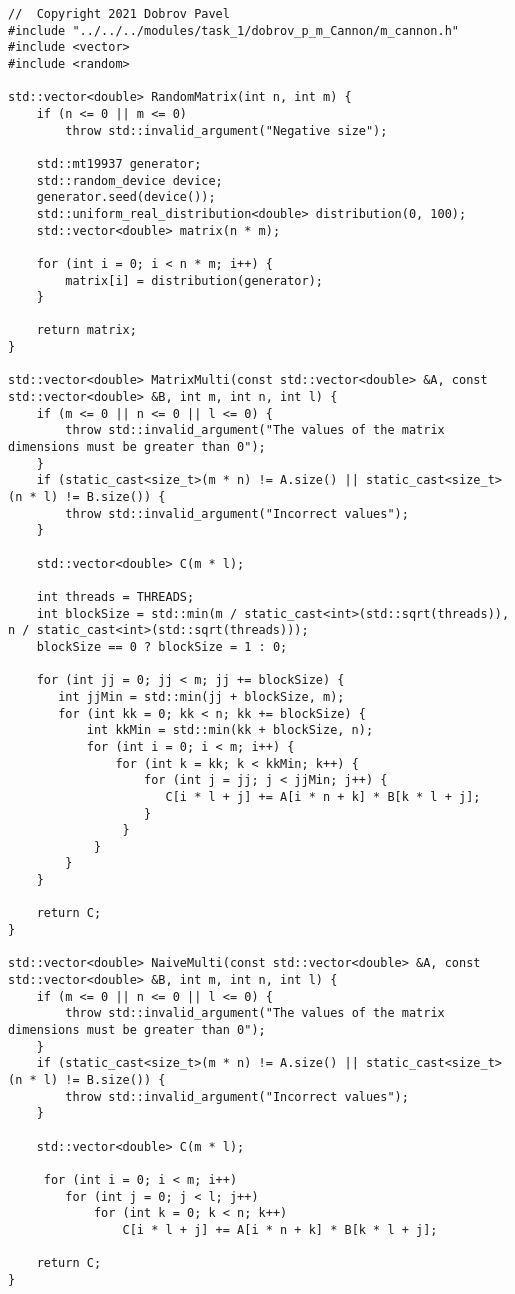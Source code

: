 \documentclass{report}
\begin{document}
\begin{lstlisting}
//  Copyright 2021 Dobrov Pavel
#include "../../../modules/task_1/dobrov_p_m_Cannon/m_cannon.h"
#include <vector>
#include <random>

std::vector<double> RandomMatrix(int n, int m) {
    if (n <= 0 || m <= 0)
        throw std::invalid_argument("Negative size");

    std::mt19937 generator;
    std::random_device device;
    generator.seed(device());
    std::uniform_real_distribution<double> distribution(0, 100);
    std::vector<double> matrix(n * m);

    for (int i = 0; i < n * m; i++) {
        matrix[i] = distribution(generator);
    }

    return matrix;
}

std::vector<double> MatrixMulti(const std::vector<double> &A, const std::vector<double> &B, int m, int n, int l) {
    if (m <= 0 || n <= 0 || l <= 0) {
        throw std::invalid_argument("The values of the matrix dimensions must be greater than 0");
    }
    if (static_cast<size_t>(m * n) != A.size() || static_cast<size_t>(n * l) != B.size()) {
        throw std::invalid_argument("Incorrect values");
    }

    std::vector<double> C(m * l);

    int threads = THREADS;
    int blockSize = std::min(m / static_cast<int>(std::sqrt(threads)), n / static_cast<int>(std::sqrt(threads)));
    blockSize == 0 ? blockSize = 1 : 0;

    for (int jj = 0; jj < m; jj += blockSize) {
       int jjMin = std::min(jj + blockSize, m);
       for (int kk = 0; kk < n; kk += blockSize) {
           int kkMin = std::min(kk + blockSize, n);
           for (int i = 0; i < m; i++) {
               for (int k = kk; k < kkMin; k++) {
                   for (int j = jj; j < jjMin; j++) {
                      C[i * l + j] += A[i * n + k] * B[k * l + j];
                   }
                }
            }
        }
    }

    return C;
}

std::vector<double> NaiveMulti(const std::vector<double> &A, const std::vector<double> &B, int m, int n, int l) {
    if (m <= 0 || n <= 0 || l <= 0) {
        throw std::invalid_argument("The values of the matrix dimensions must be greater than 0");
    }
    if (static_cast<size_t>(m * n) != A.size() || static_cast<size_t>(n * l) != B.size()) {
        throw std::invalid_argument("Incorrect values");
    }

    std::vector<double> C(m * l);

     for (int i = 0; i < m; i++)
        for (int j = 0; j < l; j++)
            for (int k = 0; k < n; k++)
                C[i * l + j] += A[i * n + k] * B[k * l + j];

    return C;
}

\end{lstlisting}
\end{document}
